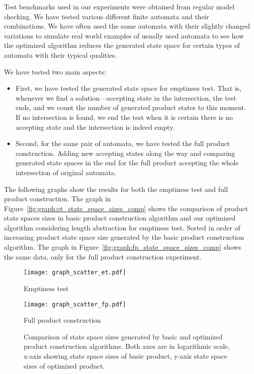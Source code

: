 Test benchmarks used in our experiments were obtained from regular model checking. We have tested various different finite automata and their combinations. We have often used the same automata with their slightly changed variations to simulate real world examples of usually used automata to see how the optimized algorithm reduces the generated state space for certain types of automata with their typical qualities.

We have tested two main aspects:
\begin{itemize}
    \item First, we have tested the generated state space for emptiness test. That is, whenever we find a solution---accepting state in the intersection, the test ends, and we count the number of generated product states to this moment. If no intersection is found, we end the test when it is certain there is no accepting state and the intersection is indeed empty.
    \item Second, for the same pair of automata, we have tested the full product construction. Adding new accepting states along the way and comparing generated state spaces in the end for the full product accepting the whole intersection of original automata.
\end{itemize}

The following graphs show the results for both the emptiness test and full product construction. The graph in Figure~\ref{fig:graph:et_state_space_sizes_comp} shows the comparison of product state spaces sizes in basic product construction algorithm and our optimized algorithm considering length abstraction for emptiness test. Sorted in order of increasing product state space size generated by the basic product construction algorithm. The graph in Figure~\ref{fig:graph:fp_state_space_sizes_comp} shows the same data, only for the full product construction experiment.

\begin{figure*}[ht]
    \centering
    \begin{minipage}{0.49\linewidth}
        \centering
        \texttt{[image: graph\_scatter\_et.pdf]}
        \caption{Emptiness test}
        \label{fig:graph:et_state_space_sizes_comp}
    \end{minipage}
    \hfill
    \begin{minipage}{0.49\linewidth}
        \centering
        \texttt{[image: graph\_scatter\_fp.pdf]}
        \caption{Full product construction}
        \label{fig:graph:fp_state_space_sizes_comp}
    \end{minipage}
    \vspace{0.5cm}
    \caption{Comparison of state space sizes generated by basic and optimized product construction algorithms. Both axes are in logarithmic scale, x-axis showing state space sizes of basic product, y-axis state space sizes of optimized product.}
    \label{fig:graph:product_state_space_sizes}
\end{figure*}

